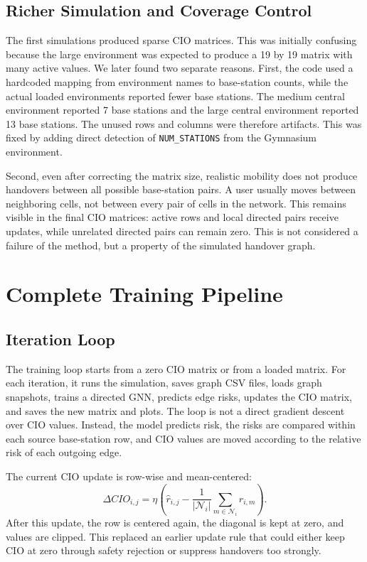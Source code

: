 \documentclass[11pt,a4paper]{article}
\begin{document}
\subsection{Richer Simulation and Coverage Control}
The first simulations produced sparse CIO matrices. This was initially confusing because the large environment was expected to produce a 19 by 19 matrix with many active values. We later found two separate reasons. First, the code used a hardcoded mapping from environment names to base-station counts, while the actual loaded environments reported fewer base stations. The medium central environment reported 7 base stations and the large central environment reported 13 base stations. The unused rows and columns were therefore artifacts. This was fixed by adding direct detection of \texttt{NUM\_STATIONS} from the Gymnasium environment.

Second, even after correcting the matrix size, realistic mobility does not produce handovers between all possible base-station pairs. A user usually moves between neighboring cells, not between every pair of cells in the network. This remains visible in the final CIO matrices: active rows and local directed pairs receive updates, while unrelated directed pairs can remain zero. This is not considered a failure of the method, but a property of the simulated handover graph.

\section{Complete Training Pipeline}
\label{sec:training_pipeline}

\subsection{Iteration Loop}
The training loop starts from a zero CIO matrix or from a loaded matrix. For each iteration, it runs the simulation, saves graph CSV files, loads graph snapshots, trains a directed GNN, predicts edge risks, updates the CIO matrix, and saves the new matrix and plots. The loop is not a direct gradient descent over CIO values. Instead, the model predicts risk, the risks are compared within each source base-station row, and CIO values are moved according to the relative risk of each outgoing edge.

The current CIO update is row-wise and mean-centered:
\begin{equation}
\Delta CIO_{i,j}=\eta\left(\hat r_{i,j}-\frac{1}{|\mathcal{N}_i|}\sum_{m\in\mathcal{N}_i}\hat r_{i,m}\right).
\end{equation}
After this update, the row is centered again, the diagonal is kept at zero, and values are clipped. This replaced an earlier update rule that could either keep CIO at zero through safety rejection or suppress handovers too strongly.
\end{document}
